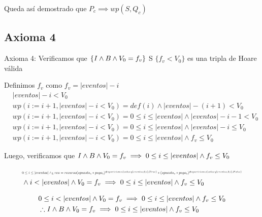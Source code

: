 \documentclass[10pt,a4paper]{article}
\begin{document}
Queda así demostrado que $P_c \implies wp(S,Q_c)$

\vspace{0.3cm}

\subsection{Axioma 4}
Axioma 4: Verificamos que $\{ {\it I} \land B \land V_0 = f_v\}$ S $\{f_v < V_0\}$ es una tripla de Hoare válida

\vspace{0.3cm}

Definimos $f_v$ como $f_v = |eventos| - i$
\begin{equation}
    \begin{aligned}
        & |eventos| - i < V_0 \\
        & wp(i:= i + 1, |eventos| - i < V_0) = def(i) \land |eventos| -(i+1) < V_0 \\
        & wp(i:= i + 1, |eventos| - i < V_0) = 0 \leq i \leq |eventos| \land |eventos| - i - 1 < V_0 \\
        & wp(i:= i + 1, |eventos| - i < V_0) = 0 \leq i \leq |eventos| \land |eventos| - i \leq V_0 \\
        & wp(i:= i + 1, |eventos| - i < V_0) = 0 \leq i \leq |eventos| \land f_v \leq V_0
    \end{aligned}
\end{equation}

Luego, verificamos que ${\it I} \land B \land V_0 = f_v \implies 0 \leq i \leq |eventos| \land f_v \leq V_0$

\begin{equation}
    \begin{split}
        &\resizebox{.9\hsize}{!}{$0 \leq i \leq |eventos| \yLuego res = recurso(apuesta_c * pago_c)^{\#apariciones(subseq(eventos,0,i),True)}*(apuesta_s * pago_s)^{\#apariciones(subseq(eventos,0,i),False)}$} \\
        & \land i < |eventos| \land V_0 = f_v \implies 0 \leq i \leq |eventos| \land f_v \leq V_0
    \end{split}
\end{equation}

\begin{equation}
    \begin{aligned}
        &0 \leq i < |eventos| \land V_0 = f_v \implies 0 \leq i \leq |eventos| \land f_v \leq V_0 \\
        &\therefore {\it I} \land B \land V_0 = f_v \implies 0 \leq i \leq |eventos| \land f_v \leq V_0
    \end{aligned}
\end{equation}
\end{document}

